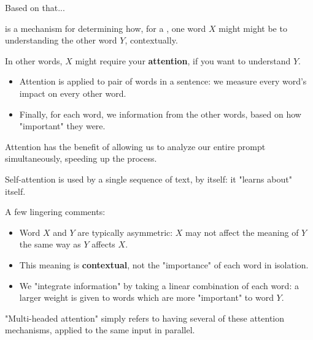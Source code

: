         Based on that...\\

        \begin{definition}
             is a mechanism for determining how, for a , one word $X$ might might be  to understanding the other word $Y$, contextually.

            In other words, $X$ might require your \textbf{attention}, if you want to understand $Y$.

            \begin{itemize}
                \item Attention is applied to  pair of words in a sentence: we measure every word's impact on every other word.
                \item Finally, for each word, we  information from the other words, based on how "important" they were.
            \end{itemize}

            \subsecdiv

            Attention has the benefit of allowing us to analyze our entire prompt simultaneously, speeding up the process.
        \end{definition}

        Self-attention is used by a single sequence of text, by itself: it "learns about" itself.\\

        \begin{clarification}

            A few lingering comments:
        
            \begin{itemize}
                \item Word $X$ and $Y$ are typically asymmetric: $X$ may not affect the meaning of $Y$ the same way as $Y$ affects $X$.
                \item This meaning is \textbf{contextual}, not the "importance" of each word in isolation.
                \item We "integrate information" by taking a linear combination of each word: a larger weight is given to words which are more "important" to word $Y$.
            \end{itemize}
        \end{clarification}

        "Multi-headed attention" simply refers to having several of these attention mechanisms, applied to the same input in parallel.

